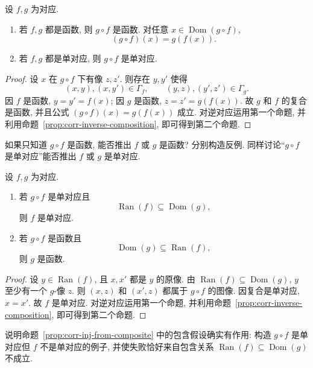 \documentclass[usesamecnt, thmcnt=section, lang=cn, newtx, 10pt, scheme=chinese]{elegantbook}
\begin{document}
\begin{proposition}\label{prop:corr-composite-single-injective}
设 $f,g$ 为对应.
\begin{enumerate}[label=\rm(\arabic*)]
  \item 若 $f,g$ 都是函数, 则 $g\circ f$ 是函数. 对任意 $x\in\operatorname{Dom}(g\circ f)$,
  \[
   (g\circ f)(x)=g(f(x)).
  \]
  \item 若 $f,g$ 都是单对应, 则 $g\circ f$ 是单对应.
\end{enumerate}
\end{proposition}

\begin{proof}
设 $x$ 在 $g\circ f$ 下有像 $z,z'$. 则存在 $y,y'$ 使得
\[
 (x,y),(x,y')\in\Gamma_f,
 \qquad
 (y,z),(y',z')\in\Gamma_g.
\]
因 $f$ 是函数, $y=y'=f(x)$; 因 $g$ 是函数, $z=z'=g(f(x))$. 故 $g$ 和 $f$ 的复合是函数, 并且公式 $(g\circ f)(x)=g(f(x))$ 成立. 对逆对应运用第一个命题, 并利用命题~\ref{prop:corr-inverse-composition}, 即可得到第二个命题.
\end{proof}

\begin{exercise}\label{ex:corr-composite-single-injective}
如果只知道 $g\circ f$ 是函数, 能否推出 $f$ 或 $g$ 是函数? 分别构造反例. 同样讨论``$g\circ f$ 是单对应''能否推出 $f$ 或 $g$ 是单对应.
\end{exercise}

\begin{proposition}\label{prop:corr-inj-from-composite}
设 $f,g$ 为对应.
\begin{enumerate}[label=\rm(\arabic*)]
  \item 若 $g\circ f$ 是单对应且
  \[
   \operatorname{Ran}(f)\subseteq\operatorname{Dom}(g),
  \]
  则 $f$ 是单对应.
  \item 若 $g\circ f$ 是函数且
  \[
   \operatorname{Dom}(g)\subseteq\operatorname{Ran}(f),
  \]
  则 $g$ 是函数.
\end{enumerate}
\end{proposition}

\begin{proof}
设 $y\in\operatorname{Ran}(f)$, 且 $x,x'$ 都是 $y$ 的原像. 由 $\operatorname{Ran}(f)\subseteq\operatorname{Dom}(g)$, $y$ 至少有一个 $g$-像 $z$. 则 $(x,z)$ 和 $(x',z)$ 都属于 $g\circ f$ 的图像. 因复合是单对应, $x=x'$. 故 $f$ 是单对应. 对逆对应运用第一个命题, 并利用命题~\ref{prop:corr-inverse-composition}, 即可得到第二个命题.
\end{proof}

\begin{exercise}\label{ex:corr-inj-from-composite}
说明命题~\ref{prop:corr-inj-from-composite} 中的包含假设确实有作用: 构造 $g\circ f$ 是单对应但 $f$ 不是单对应的例子, 并使失败恰好来自包含关系 $\operatorname{Ran}(f)\subseteq\operatorname{Dom}(g)$ 不成立.
\end{exercise}
\end{document}
